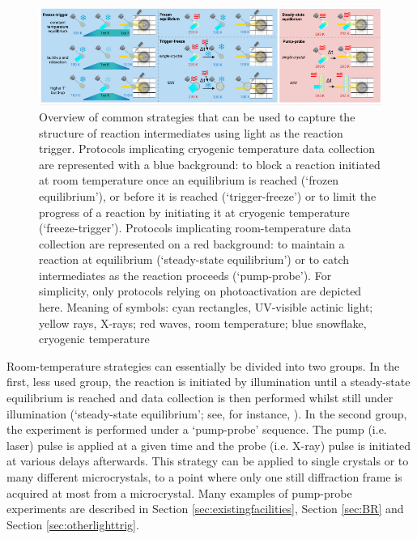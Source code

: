 \begin{figure}[H] %
    \centering
    \noindent \includegraphics[width=\textwidth]{images/Introduction/Figure1.pdf}
    \hfill
    \caption{Overview of common strategies that can be used to capture the structure of reaction intermediates using light as the reaction trigger. Protocols implicating cryogenic temperature data collection are represented with a blue background: to block a reaction initiated at room temperature once an equilibrium is reached (‘frozen equilibrium’), or before it is reached (‘trigger-freeze’) or to limit the progress of a reaction by initiating it at cryogenic temperature (‘freeze-trigger’). Protocols implicating room-temperature data collection are represented on a red background: to maintain a reaction at equilibrium (‘steady-state equilibrium’) or to catch intermediates as the reaction proceeds (‘pump-probe’). For simplicity, only protocols relying on photoactivation are depicted here. Meaning of symbols: cyan rectangles, UV-visible actinic light; yellow rays, X-rays; red waves, room temperature; blue snowflake, cryogenic temperature}
    \label{fig:Figure1}
\end{figure}

Room-temperature strategies can essentially be divided into two groups. In the first, less used group, the reaction is initiated by illumination until a steady-state equilibrium is reached and data collection is then performed whilst still under illumination (‘steady-state equilibrium’; see, for instance, \cite{crossonPhotoexcitedStructurePlant2002}). In the second group, the experiment is performed under a ‘pump-probe’ sequence. The pump (i.e. laser) pulse is applied at a given time and the probe (i.e. X-ray) pulse is initiated at various delays afterwards. This strategy can be applied to single crystals or to many different microcrystals, to a point where only one still diffraction frame is acquired at most from a microcrystal. Many examples of pump-probe experiments are described in Section \ref{sec:existingfacilities}, Section \ref{sec:BR} and Section \ref{sec:otherlighttrig}. 

